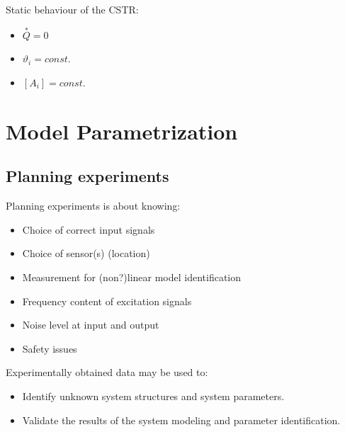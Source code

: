\documentclass[10pt,a4paper]{scrartcl}
\begin{document}
\begin{multicols*}{3}
Static behaviour of the CSTR: 

\begin{itemize}
\item $\overset{\ast}{Q}=0$
\item $\vartheta_i=const.$
\item $[A_i]=const.$
\end{itemize}




\vfill
\null
\newpage

\section{Model Parametrization}

\subsection{Planning experiments}

Planning experiments is about knowing:
\begin{itemize}
\compaq
\item Choice of correct input signals
\item Choice of sensor(s) (location)
\item Measurement for (non?)linear model identification
\item Frequency content of excitation signals
\item Noise level at input and output
\item Safety issues
\end{itemize}

Experimentally obtained data may be used to:

\begin{itemize}
\ncompaq
\item Identify unknown system structures and system parameters.
\item Validate the results of the system modeling and parameter identification.
\end{itemize}



\end{multicols*}
\end{document}
